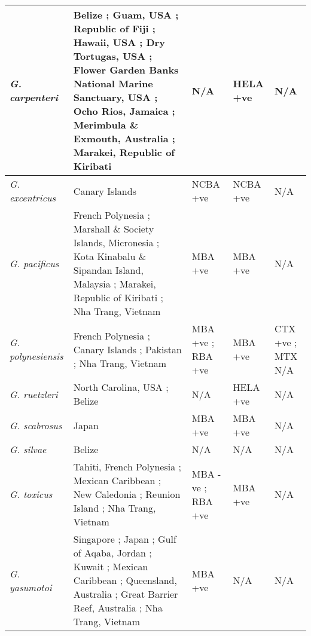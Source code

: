 \documentclass[12pt]{article}
\begin{document}
\begin{longtable}{ | p{2cm} | p{5.5cm} | p{2.3cm} | p{2.3cm} | p{2.3cm} | }
	\hline
	\emph{G. carpenteri} & Belize \cite{litaker2009taxonomy}; Guam, USA \cite{litaker2009taxonomy}; Republic of Fiji \cite{litaker2009taxonomy}; Hawaii, USA \cite{litaker2010global}; Dry Tortugas, USA \cite{holland2013differences}; Flower Garden Banks National Marine Sanctuary, USA \cite{holland2013differences}; Ocho Rios, Jamaica \cite{holland2013differences}; Merimbula \& Exmouth, Australia \cite{kohli2014cob}; Marakei, Republic of Kiribati \cite{xu2014distribution} & N/A & HELA +ve \cite{holland2013differences} & N/A \\
	\hline
	\emph{G. excentricus} & Canary Islands \cite{fraga2011gambierdiscus} & NCBA +ve \cite{fraga2011gambierdiscus} & NCBA +ve \cite{fraga2011gambierdiscus} & N/A \\
	\hline
		\emph{G. pacificus} & French Polynesia \cite{chinain1999morphology}; Marshall \& Society Islands, Micronesia \cite{litaker2010global}; Kota Kinabalu \& Sipandan Island, Malaysia \cite{mohammad2005marine}; Marakei, Republic of Kiribati \cite{xu2014distribution}; Nha Trang, Vietnam \cite{} & MBA +ve \cite{chinain1999morphology} & MBA +ve \cite{chinain1999morphology} & N/A \\
		\hline
	\emph{G. polynesiensis} & French Polynesia \cite{chinain1999morphology}; Canary Islands \cite{fraga2011gambierdiscus}; Pakistan \cite{munir2011occurrence}; Nha Trang, Vietnam \cite{} & MBA +ve \cite{chinain1999morphology}; RBA +ve \cite{chinain2010growth} & MBA +ve \cite{chinain1999morphology} & CTX +ve \cite{chinain2010growth}; MTX N/A \\
	\hline
	\emph{G. ruetzleri} & North Carolina, USA \cite{litaker2009taxonomy}; Belize \cite{litaker2009taxonomy} & N/A & HELA +ve \cite{holland2013differences} & N/A \\
	\hline
	\emph{G. scabrosus} & Japan \cite{nishimura2013genetic} & MBA +ve \cite{nishimura2013genetic} & MBA +ve \cite{nishimura2013genetic} & N/A \\
	\hline
	\emph{G. silvae} & Belize \cite{litaker2010global,fraga2014genus} &  N/A & N/A & N/A \\
	\hline
	\emph{G. toxicus} & Tahiti, French Polynesia \cite{adachi1979thecal,chinain1999morphology}; Mexican Caribbean \cite{hernandez2004species}; New Caledonia \cite{chinain1999morphology}; Reunion Island \cite{chinain1999morphology}; Nha Trang, Vietnam \cite{roeder2010characteristic} & MBA -ve \cite{chinain1999morphology}; RBA +ve \cite{chinain2010growth} & MBA +ve \cite{chinain1999morphology} & N/A \\
	\hline
	\emph{G. yasumotoi} & Singapore \cite{holmes1998gambierdiscus}; Japan \cite{nishimura2013genetic}; Gulf of Aqaba, Jordan \cite{saburova2013new}; Kuwait \cite{saburova2013new}; Mexican Caribbean \cite{hernandez2004species}; Queensland, Australia \cite{murray2014molecular}; Great Barrier Reef, Australia \cite{murray2014molecular}; Nha Trang, Vietnam \cite{} & MBA +ve \cite{} & N/A & N/A \\ %

\end{longtable}
\end{document}
